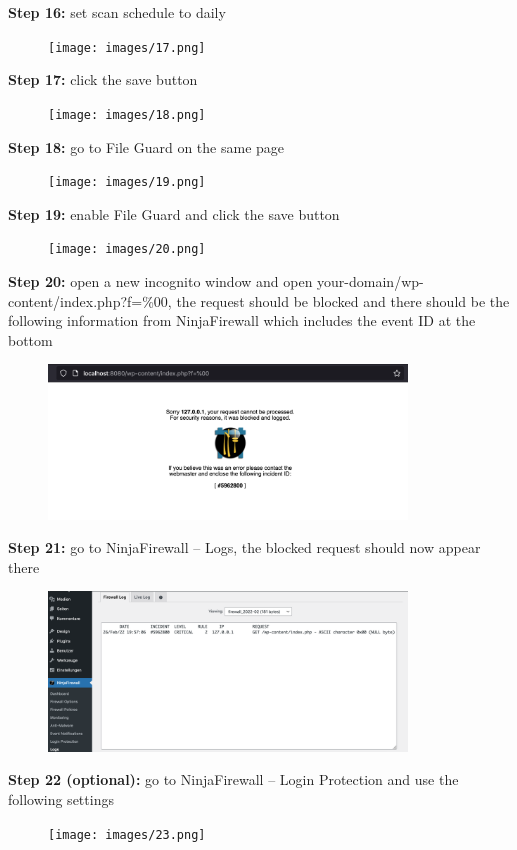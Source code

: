 \documentclass[a4paper]{article}
\begin{document}
\newpage

\noindent
\textbf{Step 16:} set scan schedule to daily

\begin{figure}[H]
  \centering
  \texttt{[image: images/17.png]}
\end{figure}

\noindent
\textbf{Step 17:} click the save button

\begin{figure}[H]
  \centering
  \texttt{[image: images/18.png]}
\end{figure}

\noindent
\textbf{Step 18:} go to File Guard on the same page

\begin{figure}[H]
  \centering
  \texttt{[image: images/19.png]}
\end{figure}

\noindent
\textbf{Step 19:} enable File Guard and click the save button

\begin{figure}[H]
  \centering
  \texttt{[image: images/20.png]}
\end{figure}

\newpage

\noindent
\textbf{Step 20:} open a new incognito window and open your-domain/wp-content/index.php?f=\%00,
the request should be blocked and there should be the following information from NinjaFirewall
which includes the event ID at the bottom

\begin{figure}[H]
  \centering
  \includegraphics[width=0.85\textwidth]{images/21.png}
\end{figure}

\noindent
\textbf{Step 21:} go to NinjaFirewall -- Logs, the blocked request should now appear there

\begin{figure}[H]
  \centering
  \includegraphics[width=0.85\textwidth]{images/22.png}
\end{figure}

\newpage

\noindent
\textbf{Step 22 (optional):} go to NinjaFirewall -- Login Protection and use the following settings

\begin{figure}[H]
  \centering
  \texttt{[image: images/23.png]}
\end{figure}

\end{document}
